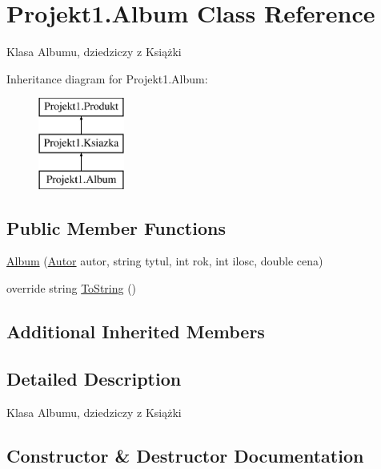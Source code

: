 \hypertarget{class_projekt1_1_1_album}{}\section{Projekt1.\+Album Class Reference}
\label{class_projekt1_1_1_album}


Klasa Albumu, dziedziczy z Książki  


Inheritance diagram for Projekt1.\+Album\+:\begin{figure}[H]
\begin{center}
\leavevmode
\includegraphics[height=3.000000cm]{class_projekt1_1_1_album}
\end{center}
\end{figure}
\subsection*{Public Member Functions}
\begin{DoxyCompactItemize}
\item 
\mbox{\hyperlink{class_projekt1_1_1_album_ac5d4c525aa9d851aa8cff2093a8c4f17}{Album}} (\mbox{\hyperlink{class_projekt1_1_1_autor}{Autor}} autor, string tytul, int rok, int ilosc, double cena)
\item 
override string \mbox{\hyperlink{class_projekt1_1_1_album_a5e93d9b6fc14969f45e073f3b2e9dae5}{To\+String}} ()
\end{DoxyCompactItemize}
\subsection*{Additional Inherited Members}


\subsection{Detailed Description}
Klasa Albumu, dziedziczy z Książki 



\subsection{Constructor \& Destructor Documentation}
\mbox{\label{class_projekt1_1_1_album_ac5d4c525aa9d851aa8cff2093a8c4f17}} 
